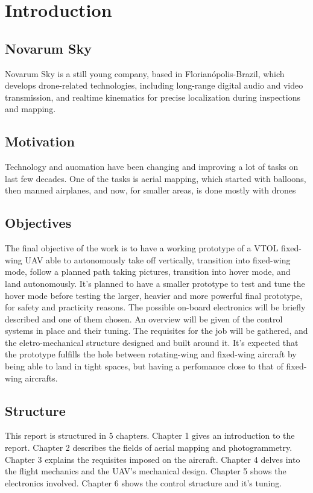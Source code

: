 

\chapter{Introduction} \label{chap:1}


\section{Novarum Sky}
Novarum Sky is a still young company, based in Florianópolis-Brazil, which develops drone-related technologies, including long-range digital audio and video transmission, and realtime kinematics for precise localization during inspections and mapping.

\section{Motivation}
Technology and auomation have been changing and improving a lot of tasks on last few decades.%
%
One of the tasks is aerial mapping, which started with balloons, then manned airplanes, and now, for smaller areas, is done mostly with drones
%

%
%
% 
%
%


\section{Objectives}

%
The final objective of the work is to have a working prototype of a VTOL fixed-wing UAV able to autonomously take off vertically, transition into fixed-wing mode, follow a planned path taking pictures, transition into hover mode, and land autonomously.
%
It's planned to have a smaller prototype to test and tune the hover mode before testing the larger, heavier and more powerful final prototype, for safety and practicity reasons.
%
The possible on-board electronics will be briefly described and one of them chosen.
%
An overview will be given of the control systems in place and their tuning.
%
The requisites for the job will be gathered, and the eletro-mechanical structure designed and built around it.
%
It's expected that the prototype fulfills the hole between rotating-wing and fixed-wing aircraft by being able to land in tight spaces, but having a perfomance close to that of fixed-wing aircrafts. 

%
\section{Structure}

%
This report is structured in 5 chapters.
%
Chapter 1 gives an introduction to the report.
%
Chapter 2 describes the fields of aerial mapping and photogrammetry.
%
Chapter 3 explains the requisites imposed on the aircraft.
%
Chapter 4 delves into the flight mechanics and the UAV's mechanical design.
%
Chapter 5 shows the electronics involved.
%
Chapter 6 shows the control structure and it's tuning.


